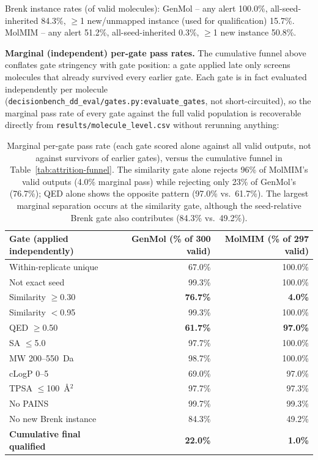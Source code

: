 \documentclass{article}
\begin{document}
Brenk instance rates (of valid molecules): GenMol -- any alert 100.0\%, all-seed-inherited 84.3\%, $\geq$1 new/unmapped instance (used for qualification) 15.7\%. MolMIM -- any alert 51.2\%, all-seed-inherited 0.3\%, $\geq$1 new instance 50.8\%.

\textbf{Marginal (independent) per-gate pass rates.} The cumulative funnel above conflates gate stringency with gate position: a gate applied late only screens molecules that already survived every earlier gate. Each gate is in fact evaluated independently per molecule (\texttt{decisionbench\_dd\_eval/gates.py:evaluate\_gates}, not short-circuited), so the marginal pass rate of every gate against the full valid population is recoverable directly from \texttt{results/molecule\_level.csv} without rerunning anything:

\begin{table}[h]
\centering
\footnotesize
\begin{tabular}{lrr}
\toprule
Gate (applied independently) & GenMol (\% of 300 valid) & MolMIM (\% of 297 valid) \\
\midrule
Within-replicate unique & 67.0\% & 100.0\% \\
Not exact seed & 99.3\% & 100.0\% \\
Similarity $\geq$0.30 & \textbf{76.7\%} & \textbf{4.0\%} \\
Similarity $<$0.95 & 99.3\% & 100.0\% \\
QED $\geq$0.50 & \textbf{61.7\%} & \textbf{97.0\%} \\
SA $\leq$5.0 & 97.7\% & 100.0\% \\
MW 200--550~Da & 98.7\% & 100.0\% \\
cLogP 0--5 & 69.0\% & 97.0\% \\
TPSA $\leq$100~\AA$^2$ & 97.7\% & 97.3\% \\
No PAINS & 99.7\% & 99.3\% \\
No new Brenk instance & 84.3\% & 49.2\% \\
\midrule
\textbf{Cumulative final qualified} & \textbf{22.0\%} & \textbf{1.0\%} \\
\bottomrule
\end{tabular}
\caption{Marginal per-gate pass rate (each gate scored alone against all valid outputs, not against survivors of earlier gates), versus the cumulative funnel in Table~\ref{tab:attrition-funnel}. The similarity gate alone rejects 96\% of MolMIM's valid outputs (4.0\% marginal pass) while rejecting only 23\% of GenMol's (76.7\%); QED alone shows the opposite pattern (97.0\% vs.\ 61.7\%). The largest marginal separation occurs at the similarity gate, although the seed-relative Brenk gate also contributes (84.3\% vs.\ 49.2\%).}
\label{tab:pergate}
\end{table}
\end{document}
